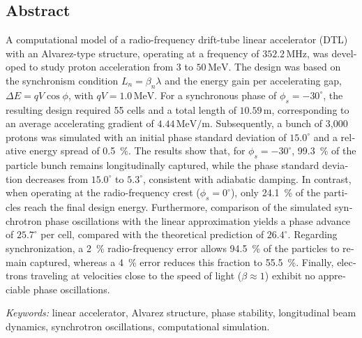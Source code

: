 
\clearpage

\begin{otherlanguage}{english}

\chapter*{Abstract}
\thispagestyle{empty}


A computational model of a radio-frequency drift-tube
linear accelerator (DTL) with an Alvarez-type structure,
operating at a frequency of $352.2\,\mathrm{MHz}$, was
developed to study proton acceleration from $3$ to
$50\,\mathrm{MeV}$. The design was based on the synchronism
condition $L_n=\beta_n\lambda$ and the energy gain per
accelerating gap, $\Delta E=qV\cos\phi$, with
$qV=1.0\,\mathrm{MeV}$. For a synchronous phase of
$\phi_s=-30^\circ$, the resulting design required 55 cells
and a total length of $10.59\,\mathrm{m}$, corresponding to
an average accelerating gradient of $4.44\,\mathrm{MeV/m}$.
Subsequently, a bunch of 3,000 protons was simulated with
an initial phase standard deviation of $15.0^\circ$ and a
relative energy spread of \SI{0.5}{\percent}. The results
show that, for $\phi_s=-30^\circ$, \SI{99.3}{\percent}
of the particle bunch remains longitudinally captured,
while the phase standard deviation decreases from
$15.0^\circ$ to $5.3^\circ$, consistent with adiabatic
damping. In contrast, when operating at the
radio-frequency crest ($\phi_s=0^\circ$), only
\SI{24.1}{\percent} of the particles reach the final
design energy. Furthermore, comparison of the simulated
synchrotron phase oscillations with the linear approximation
yields a phase advance of $25.7^\circ$ per cell, compared
with the theoretical prediction of $26.4^\circ$. Regarding
synchronization, a \SI{2}{\percent} radio-frequency error
allows \SI{94.5}{\percent} of the particles to remain
captured, whereas a \SI{4}{\percent} error reduces this
fraction to \SI{55.5}{\percent}. Finally, electrons
traveling at velocities close to the speed of light
($\beta\approx 1$) exhibit no appreciable phase oscillations.

\vspace{6pt}

\noindent
\hspace*{0.5in}
\textit{Keywords:}
linear accelerator, Alvarez structure, phase stability,
longitudinal beam dynamics, synchrotron oscillations,
computational simulation.

\end{otherlanguage}
